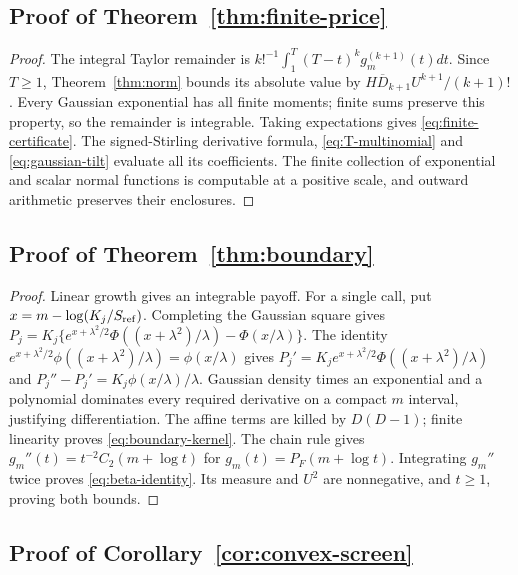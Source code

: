 \documentclass[11pt]{article}
\begin{document}
\subsection{Proof of Theorem~\ref{thm:finite-price}}
\label{app:proof-finite-price}

\begin{proof}
The integral Taylor remainder is
$k!^{-1}\int_1^T(T-t)^kg_m^{(k+1)}(t)dt$.
Since $T\geq1$, Theorem~\ref{thm:norm} bounds its absolute value by
$H\overline D_{k+1}U^{k+1}/(k+1)!$.
Every Gaussian exponential has all finite moments; finite sums preserve
this property, so the remainder is integrable.  Taking expectations gives
\eqref{eq:finite-certificate}.  The signed-Stirling derivative formula,
\eqref{eq:T-multinomial} and \eqref{eq:gaussian-tilt} evaluate all its
coefficients.  The finite collection of exponential and scalar normal
functions is computable at a positive scale, and outward arithmetic
preserves their enclosures.
\end{proof}

\subsection{Proof of Theorem~\ref{thm:boundary}}
\label{app:proof-boundary}

\begin{proof}
Linear growth gives an integrable payoff. For a single call, put
$x=m-\log(K_j/S_{\rm ref})$. Completing the Gaussian square gives
$P_j=K_j\{e^{x+\lambda^2/2}\Phi((x+\lambda^2)/\lambda)
-\Phi(x/\lambda)\}$.
The identity $e^{x+\lambda^2/2}\phi((x+\lambda^2)/\lambda)=\phi(x/\lambda)$
gives $P_j'=K_je^{x+\lambda^2/2}\Phi((x+\lambda^2)/\lambda)$ and
$P_j''-P_j'=K_j\phi(x/\lambda)/\lambda$.
Gaussian density times an exponential and a polynomial dominates every
required derivative on a compact $m$ interval, justifying differentiation.
The affine terms are killed by $D(D-1)$; finite linearity proves
\eqref{eq:boundary-kernel}. The chain rule gives
$g_m''(t)=t^{-2}C_2(m+\log t)$ for $g_m(t)=P_F(m+\log t)$.
Integrating $g_m''$ twice proves \eqref{eq:beta-identity}.
Its measure and $U^2$ are nonnegative, and $t\geq1$, proving both bounds.
\end{proof}

\subsection{Proof of Corollary~\ref{cor:convex-screen}}
\label{app:proof-convex-screen}
\end{document}
